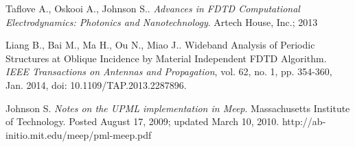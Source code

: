 \documentclass{article}
\begin{document}
\begin{thebibliography}{9}
Taflove A., Oskooi A., Johnson S.. \emph{Advances in FDTD Computational Electrodynamics: Photonics and Nanotechnology}.  Artech House, Inc.; 2013

Liang B., Bai M., Ma H., Ou N., Miao J.. Wideband Analysis of Periodic Structures at Oblique Incidence by Material Independent FDTD Algorithm. \emph{IEEE Transactions on Antennas and Propagation}, vol. 62, no. 1, pp. 354-360, Jan. 2014, doi: 10.1109/TAP.2013.2287896.

Johnson S. \emph{Notes on the UPML implementation in Meep}. Massachusetts Institute of Technology. Posted August 17, 2009; updated March 10, 2010. http://ab-initio.mit.edu/meep/pml-meep.pdf

\end{thebibliography}
\end{document}
